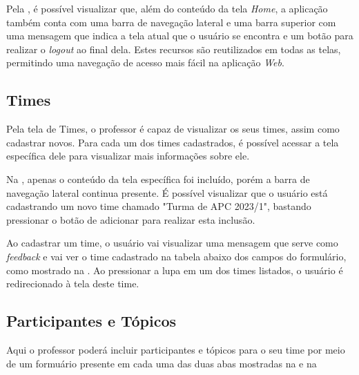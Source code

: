 
Pela , é possível visualizar que, além do conteúdo da tela \textit{Home}, a aplicação também conta com uma barra de navegação lateral e uma barra superior com uma mensagem que indica a tela atual que o usuário se encontra e um botão para realizar o \textit{logout} ao final dela. Estes recursos são reutilizados em todas as telas, permitindo uma navegação de acesso mais fácil na aplicação \textit{Web}.

\subsection{Times}

Pela tela de Times, o professor é capaz de visualizar os seus times, assim como cadastrar novos. Para cada um dos times cadastrados, é possível acessar a tela específica dele para visualizar mais informações sobre ele.


Na , apenas o conteúdo da tela específica foi incluído, porém a barra de navegação lateral continua presente. É possível visualizar que o usuário está cadastrando um novo time chamado "Turma de APC 2023/1", bastando pressionar o botão de adicionar para realizar esta inclusão.


Ao cadastrar um time, o usuário vai visualizar uma mensagem que serve como \textit{feedback} e vai ver o time cadastrado na tabela abaixo dos campos do formulário, como mostrado na . Ao pressionar a lupa em um dos times listados, o usuário é redirecionado à tela deste time.

\subsection{Participantes e Tópicos}

Aqui o professor poderá incluir participantes e tópicos para o seu time por meio de um formuário presente em cada uma das duas abas mostradas na  e na  


